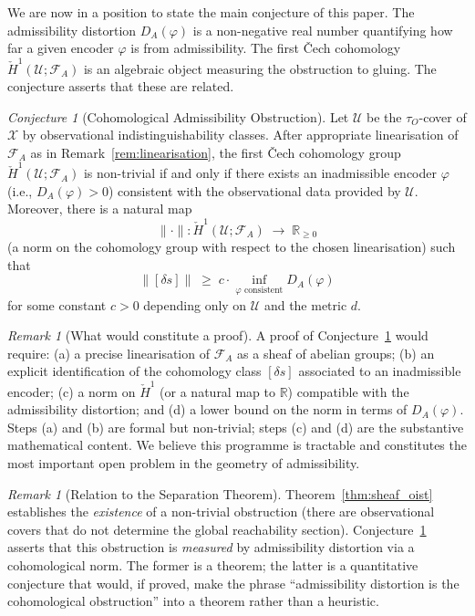 \documentclass[11pt, a4paper]{article}
\theoremstyle{plain}
\theoremstyle{definition}
\theoremstyle{remark}
\newtheorem{remark}[theorem]{Remark}
\newtheorem{conjecture}[theorem]{Conjecture}
\newcommand{\R}{\mathbb{R}}
\newcommand{\calX}{\mathcal{X}}
\newcommand{\calF}{\mathcal{F}}
\newcommand{\DA}{D_{A}(\varphi)}
\begin{document}
We are now in a position to state the main conjecture of this paper. The
admissibility distortion $\DA$ is a non-negative real number quantifying how
far a given encoder $\varphi$ is from admissibility. The first \v{C}ech
cohomology $\check{H}^1(\mathcal{U}; \calF_A)$ is an algebraic object
measuring the obstruction to gluing. The conjecture asserts that these are
related.

\begin{conjecture}[Cohomological Admissibility Obstruction]
\label{conj:cohomology}
Let $\mathcal{U}$ be the $\tau_O$-cover of $\calX$ by observational
indistinguishability classes. After appropriate linearisation of $\calF_A$
as in Remark~\ref{rem:linearisation}, the first \v{C}ech cohomology group
$\check{H}^1(\mathcal{U}; \calF_A)$ is non-trivial if and only if there
exists an inadmissible encoder $\varphi$ (i.e., $\DA > 0$) consistent with
the observational data provided by $\mathcal{U}$. Moreover, there is a
natural map
\[
  \|\cdot\|\colon \check{H}^1(\mathcal{U}; \calF_A) \;\to\; \R_{\geq 0}
\]
(a norm on the cohomology group with respect to the chosen linearisation)
such that
\[
  \|[\delta s]\| \;\geq\; c \cdot \inf_{\varphi\text{ consistent}} \DA
\]
for some constant $c > 0$ depending only on $\mathcal{U}$ and the metric $d$.
\end{conjecture}

\begin{remark}[What would constitute a proof]
A proof of Conjecture~\ref{conj:cohomology} would require: (a) a precise
linearisation of $\calF_A$ as a sheaf of abelian groups; (b) an explicit
identification of the cohomology class $[\delta s]$ associated to an
inadmissible encoder; (c) a norm on $\check{H}^1$ (or a natural map to $\R$)
compatible with the admissibility distortion; and (d) a lower bound on the
norm in terms of $\DA$. Steps (a) and (b) are formal but non-trivial; steps
(c) and (d) are the substantive mathematical content. We believe this programme
is tractable and constitutes the most important open problem in the geometry
of admissibility.
\end{remark}

\begin{remark}[Relation to the Separation Theorem]
Theorem~\ref{thm:sheaf_oist} establishes the \emph{existence} of a non-trivial
obstruction (there are observational covers that do not determine the global
reachability section). Conjecture~\ref{conj:cohomology} asserts that this
obstruction is \emph{measured} by admissibility distortion via a cohomological
norm. The former is a theorem; the latter is a quantitative conjecture that
would, if proved, make the phrase ``admissibility distortion is the
cohomological obstruction'' into a theorem rather than a heuristic.
\end{remark}
\end{document}
